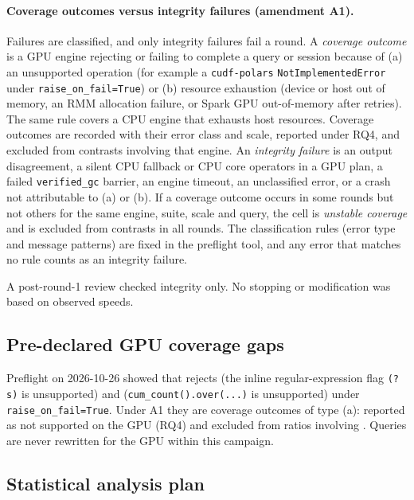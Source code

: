 \documentclass[11pt]{article}
\begin{document}
\paragraph{Coverage outcomes versus integrity failures (amendment A1).}
Failures are classified, and only integrity failures fail a round. A
\emph{coverage outcome} is a GPU engine rejecting or failing to complete a
query or session because of (a) an unsupported operation (for example a
\texttt{cudf-polars} \texttt{NotImplementedError} under
\texttt{raise\_on\_fail=True}) or (b) resource exhaustion (device or host
out of memory, an RMM allocation failure, or Spark GPU out-of-memory after
retries). The same rule covers a CPU engine that exhausts host resources.
Coverage outcomes are recorded with their error class and scale, reported
under RQ4, and excluded from contrasts involving that engine. An
\emph{integrity failure} is an output disagreement, a silent CPU fallback or
CPU core operators in a GPU plan, a failed \texttt{verified\_gc} barrier, an
engine timeout, an unclassified error, or a crash not attributable to (a) or
(b). If a coverage outcome occurs in some rounds but not others for the same
engine, suite, scale and query, the cell is \emph{unstable coverage} and is
excluded from contrasts in all rounds. The classification rules (error
type and message patterns) are fixed in the preflight tool, and any error
that matches no rule counts as an integrity failure.

A post-round-1 review checked integrity only. No stopping or modification was
based on observed speeds.

\subsection{Pre-declared GPU coverage gaps}
\label{sec:coverage-design}

Preflight on 2026-10-26 showed that \polarsgpu{} rejects  (the
inline regular-expression flag \texttt{(?s)} is unsupported) and
 (\texttt{cum\_count().over(...)} is unsupported) under
\texttt{raise\_on\_fail=True}. Under A1 they are coverage outcomes of type
(a): reported as not supported on the GPU (RQ4) and excluded from ratios
involving \polarsgpu{}. Queries are never rewritten for the GPU within this
campaign.

\subsection{Statistical analysis plan}
\label{sec:stats}
\end{document}
